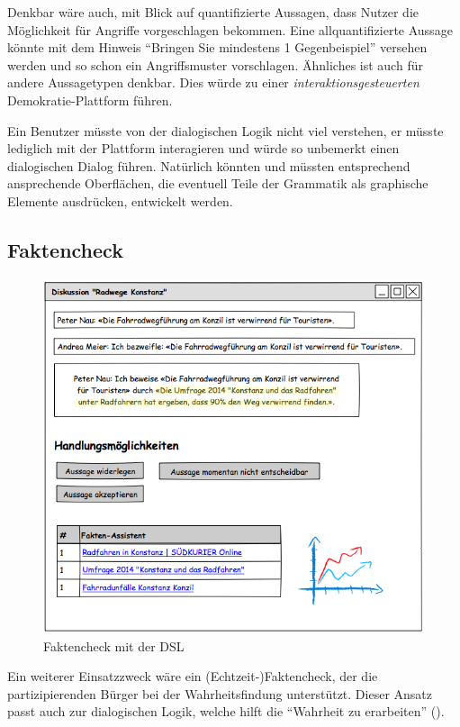 \documentclass[11pt,a4paper,bibtotocnumbered]{scrreprt}
\begin{document}
Denkbar wäre auch, mit Blick auf quantifizierte Aussagen, dass Nutzer die Möglichkeit für Angriffe vorgeschlagen bekommen.
Eine allquantifizierte Aussage könnte mit dem Hinweis \enquote{Bringen Sie mindestens 1 Gegenbeispiel} versehen werden und so schon ein Angriffsmuster vorschlagen.
Ähnliches ist auch für andere Aussagetypen denkbar.
Dies würde zu einer \emph{interaktionsgesteuerten} Demokratie-Plattform führen.

Ein Benutzer müsste von der dialogischen Logik nicht viel verstehen, er müsste lediglich mit der Plattform interagieren und würde so unbemerkt einen dialogischen Dialog führen.
Natürlich könnten und müssten entsprechend ansprechende Oberflächen, die eventuell Teile der Grammatik als graphische Elemente ausdrücken, entwickelt werden.

\subsection{Faktencheck} %

\begin{figure}[H]
\centering
\includegraphics[width=1\textwidth]{img/faktencheck.png}
\caption{Faktencheck mit der DSL}
\label{faktencheck}
\end{figure}

Ein weiterer Einsatzzweck wäre ein (Echtzeit-)Faktencheck, der die partizipierenden Bürger bei der Wahrheitsfindung unterstützt.
Dieser Ansatz passt auch zur dialogischen Logik, welche hilft die \enquote{Wahrheit zu erarbeiten} (\cite{OrtnerDL}).
\end{document}
